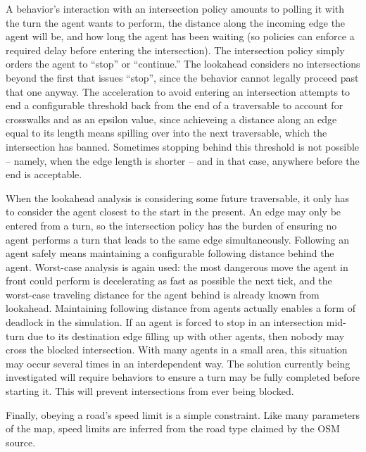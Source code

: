 \documentclass[letterpaper, 10 pt, conference]{ieeeconf}  %
\begin{document}
A behavior's interaction with an intersection policy amounts to polling it with
the turn the agent wants to perform, the distance along the incoming edge the
agent will be, and how long the agent has been waiting (so policies can enforce
a required delay before entering the intersection). The intersection policy
simply orders the agent to ``stop'' or ``continue.'' The lookahead considers no
intersections beyond the first that issues ``stop'', since the behavior cannot
legally proceed past that one anyway.  The acceleration to avoid entering an
intersection attempts to end a configurable threshold back from the end of a
traversable to account for crosswalks and as an epsilon value, since achieveing
a distance along an edge equal to its length means spilling over into the next
traversable, which the intersection has banned. Sometimes stopping behind this
threshold is not possible -- namely, when the edge length is shorter -- and in
that case, anywhere before the end is acceptable.

When the lookahead analysis is considering some future traversable, it only has
to consider the agent closest to the start in the present. An edge may only be
entered from a turn, so the intersection policy has the burden of ensuring no
agent performs a turn that leads to the same edge simultaneously. Following an
agent safely means maintaining a configurable following distance behind the
agent. Worst-case analysis is again used: the most dangerous move the agent in
front could perform is decelerating as fast as possible the next tick, and the
worst-case traveling distance for the agent behind is already known from
lookahead. Maintaining following distance from agents actually enables a form of
deadlock in the simulation. If an agent is forced to stop in an intersection
mid-turn due to its destination edge filling up with other agents, then nobody
may cross the blocked intersection. With many agents in a small area, this
situation may occur several times in an interdependent way. The solution
currently being investigated will require behaviors to ensure a turn may be
fully completed before starting it. This will prevent intersections from ever
being blocked.

Finally, obeying a road's speed limit is a simple constraint. Like many
parameters of the map, speed limits are inferred from the road type claimed by
the OSM source.
\end{document}
